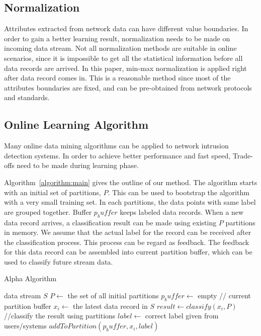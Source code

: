 \documentclass[runningheads]{llncs}
\begin{document}
	\subsection{Normalization}
	Attributes extracted from network data can have different value boundaries. In order to gain a better learning result, normalization needs to be made on incoming data stream. Not all normalization methods are suitable in online scenarios, since it is impossible to get all the statistical information before all data records are arrived. In this paper, min-max normalization is applied right after data record comes in. This is a reasonable method since most of the attributes boundaries are fixed, and can be pre-obtained from network protocols and standards.
	
	\subsection{Online Learning Algorithm}
	Many online data mining algorithms can be applied to network intrusion detection systems. In order to achieve better performance and fast speed, Trade-offs need to be made during learning phase.
	
	Algorithm~\ref{algorithm:main} gives the outline of our method. The algorithm starts with an initial set of partitions, $P$. This can be used to bootstrap the algorithm with a very small training set. In each partitions, the data points with same label are grouped together. Buffer $p_buffer$ keeps labeled data records. When a new data record arrives, a classification result can be made using existing $P$ partitions in memory. We assume that the actual label for the record can be received after the classification process. This process can be regard as feedback. The feedback for this data record can be assembled into current partition buffer, which can be used to classify future stream data.
	
	\begin{algorithm}
		\caption{Alpha Algorithm} \label{algorithm:main}
		\begin{algorithmic}
			\REQUIRE data stream $S$
			\STATE $P \gets$ the set of all initial partitions
			\STATE $p_buffer \gets$ empty // current partition buffer
			\STATE $x_i \gets $ the latest data record in $S$
			\STATE $result \gets classify(x_i, P)$ //classify the result using partitions
			\STATE $label \gets$ correct label given from users/systems
			\STATE $addToPartition(p_buffer, x_i, label)$ 
			\ENDWHILE
		\end{algorithmic}
	\end{algorithm}
	
\end{document}
